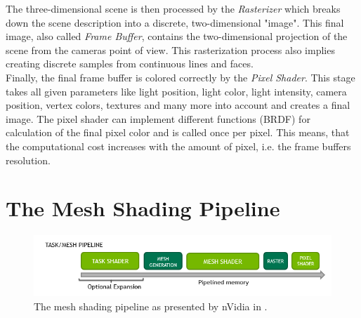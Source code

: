 \noindent
The three-dimensional scene is then processed by the \emph{Rasterizer} which breaks down the scene description into 
a discrete, two-dimensional "image". This final image, also called \emph{Frame Buffer}, contains the two-dimensional 
projection of the scene from the cameras point of view. This rasterization process also implies creating discrete 
samples from continuous lines and faces. \\

\noindent
Finally, the final frame buffer is colored correctly by the \emph{Pixel Shader}. This stage takes all given parameters 
like light position, light color, light intensity, camera position, vertex colors, textures and many more into account 
and creates a final image. The pixel shader can implement different functions (\ac{BRDF}) for calculation of the final pixel color 
and is called once per pixel. This means, that the computational cost increases with the amount of pixel, i.e. the frame 
buffers resolution. \\








\section{The Mesh Shading Pipeline} \label{sec-mesh-shading-pipeline}


\begin{figure}[h]
    \centering
    \includegraphics[width=\linewidth]{images/graphics/mesh-rendering-pipeline.png}
    \caption{The mesh shading pipeline as presented by nVidia in \cite[Christoph Kubisch]{Kubisch2018}.}
    \label{fig:mesh-rendering-pipeline}
\end{figure}

